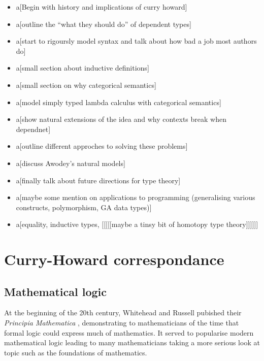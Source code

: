 \begin{itemize}
\item a[Begin with history and implications of curry howard]

\item a[outline the ``what they should do'' of dependent types]

\item a[start to rigoursly model syntax and talk about how bad a job most authors do]

\item a[small section about inductive definitions]

\item a[small section on why categorical semantics]

\item a[model simply typed lambda calculus with categorical semantics]

\item a[show natural extensions of the idea and why contexts break when dependnet]

\item a[outline different approches to solving these problems]

\item a[discuss Awodey's natural models]

\item a[finally talk about future directions for type theory]

\item a[maybe some mention on applications to programming (generalising various constructs, polymorphism, GA data types)]

\item a[equality, inductive types, [[[[[maybe a tinsy bit of homotopy type theory]]]]]]
\end{itemize}

\section{Curry-Howard correspondance}

\subsection{Mathematical logic}

At the beginning of the 20th century, Whitehead and Russell pubished their \emph{Principia Mathematica} \cite{GlossarWiki:Whitehead_Russell:1910}, demonstrating to mathematicians of the time that formal logic could express much of mathematics. It served to popularise modern mathematical logic leading to many mathematicians taking a more serious look at topic such as the foundations of mathematics.

